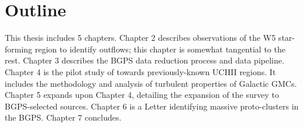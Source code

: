 
\section{Outline}
This thesis includes 5 chapters.
Chapter 2 describes observations of the W5 star-forming region to identify outflows;
this chapter is somewhat tangential to the rest.
Chapter 3 describes the BGPS data reduction process and data pipeline.
Chapter 4 is the pilot study of \formaldehyde towards previously-known UCHII regions.
It includes the methodology and analysis of turbulent properties of Galactic GMCs.
Chapter 5 expands upon Chapter 4, detailing the expansion of the \formaldehyde survey
to BGPS-selected sources.
Chapter 6 is a Letter identifying massive proto-clusters in the BGPS.
Chapter 7 concludes.



